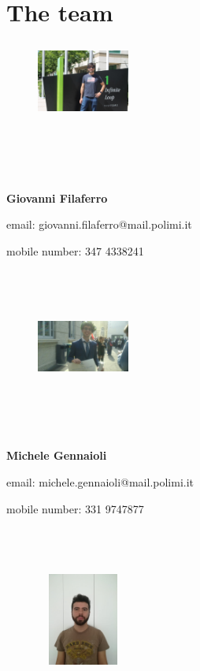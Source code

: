 \documentclass[a4paper,11pt]{report}
\begin{document}
\chapter{The team}
\begin{figure}
    \includegraphics[width=1.2in,height=1in,clip,keepaspectratio]{images/Filaferro.jpeg}
\end{figure}\par
\\~\\~\par\textbf{Giovanni Filaferro}\par
email: giovanni.filaferro@mail.polimi.it\par
mobile number: 347 4338241
\\~\\~\par
\begin{figure} 
    \includegraphics[width=1.2in,height=1.2in,clip,keepaspectratio]{images/Gennaioli.jpeg}
\end{figure}\par
\\~\par\textbf{Michele Gennaioli}\par
email: michele.gennaioli@mail.polimi.it\par
mobile number: 331 9747877
\\~\\~\\~\par
\begin{figure} 
    \includegraphics[width=1.2in,height=1.2in,clip,keepaspectratio]{images/Manzi.jpeg}
\end{figure}\
\end{document}
